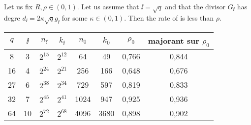 \documentclass[10pt]{article}
\begin{document}
\begin{proposition}
	Let us fix $R, \rho \in (0,1)$. Let us assume that $\ii =\sqrt{q}$ and that the divisor $G_{\ii}$ has degre $d_{\ii} = 2\kappa \sqrt{q}g_{\ii}$ for some $\kappa \in (0,1)$.
	Then the rate of  is less than $\rho$.
\end{proposition}




\newpage



\begin{center}
\begin{tabular}{|c|c|c|c|c|c|c|c|}
\hline
$q$ & $\ii$ & $n_{\ii}$ & $k_{\ii}$ & $n_0$ & $k_0$ & $\rho_0$ & majorant sur $\rho_0$ \\ 
\hline
8 & 3 & $2^{15}$ & $2^{12}$ & 64 & 49 & 0,766 & 0,844 \\
\hline
16 & 4 & $2^{24}$ & $2^{21}$ & 256 & 166 & 0,648 & 0,676 \\
\hline
27 & 6 & $2^{38}$ & $2^{34}$ & 729 & 597 & 0,819 & 0,833 \\
\hline
32 & 7 & $2^{45}$ & $2^{41}$ & 1024 & 947 & 0,925 & 0,936 \\
\hline
64 & 10 & $2^{72}$ & $2^{68}$ & 4096 & 3680 & 0,898 & 0,902 \\
\hline
\end{tabular}
\end{center}

\newpage



\end{document}
